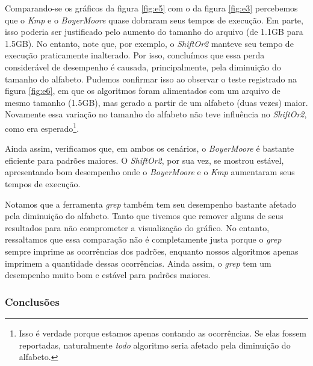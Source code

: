\documentclass[]{article}
\newcommand{\figref}[1]{figura \ref{#1}}
\begin{document}
Comparando-se os gráficos da \figref{fig:e5} com o da \figref{fig:e3} percebemos que o \textit{Kmp} e o \textit{BoyerMoore} quase dobraram seus tempos de execução. Em parte, isso poderia ser justificado pelo aumento do tamanho do arquivo (de 1.1GB para 1.5GB). No entanto, note que, por exemplo, o \textit{ShiftOr2} manteve seu tempo de execução praticamente inalterado. Por isso, concluímos que essa perda considerável de desempenho é causada, principalmente, pela diminuição do tamanho do alfabeto. Pudemos confirmar isso ao observar o teste registrado na \figref{fig:e6}, em que os algoritmos foram alimentados com um arquivo de mesmo tamanho (1.5GB), mas gerado a partir de um alfabeto (duas vezes) maior. Novamente essa variação no tamanho do alfabeto não teve influência no \textit{ShiftOr2}, como era esperado\footnote{Isso é verdade porque estamos apenas contando as ocorrências. Se elas fossem reportadas, naturalmente \textit{todo} algoritmo seria afetado pela diminuição do alfabeto.}.

Ainda assim, verificamos que, em ambos os cenários, o \textit{BoyerMoore} é bastante eficiente para padrões maiores. O \textit{ShiftOr2}, por sua vez, se mostrou estável, apresentando bom desempenho onde o \textit{BoyerMoore} e o \textit{Kmp} aumentaram seus tempos de execução. 

Notamos que a ferramenta \textit{grep} também tem seu desempenho bastante afetado pela diminuição do alfabeto. Tanto que tivemos que remover alguns de seus resultados para não comprometer a visualização do gráfico. No entanto, ressaltamos que essa comparação não é completamente justa porque o \textit{grep} sempre imprime as ocorrências dos padrões, enquanto nossos algoritmos apenas imprimem a quantidade dessas ocorrências. Ainda assim, o \textit{grep} tem um desempenho muito bom e estável para padrões maiores.

\subsubsection{Conclusões}
\end{document}
